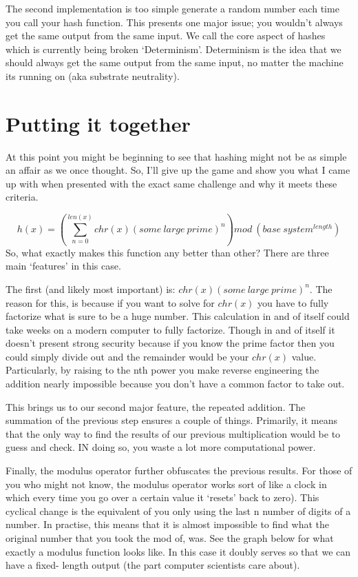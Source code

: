 \documentclass[11pt, oneside]{article}   	%
\begin{document}
The second implementation is too simple generate a random number each time you call your hash function. This presents one major issue; you wouldn’t always get the same output from the same input. We call the core aspect of hashes which is currently being broken ‘Determinism’. Determinism is the idea that we should always get the same output from the same input, no matter the machine its running on (aka substrate neutrality).

\section{Putting it together}

At this point you might be beginning to see that hashing might not be as simple an affair as we once thought. So, I’ll give up the game and show you what I came up with when presented with the exact same challenge and why it meets these criteria.

\begin{equation}
    h(x) =  \left(\sum_{n=0}^{len(x)} chr(x)(some\ large\ prime)^n\right)  mod\ (base\ system^{length})
\end{equation}
So, what exactly makes this function any better than other? There are three main ‘features’ in this case.

The first (and likely most important) is: $chr(x)(some\ large\ prime)^n$. The reason for this, is because if you want to solve for $chr(x)$ you have to fully factorize what is sure to be a huge number. This calculation in and of itself could take weeks on a modern computer to fully factorize. Though in and of itself it doesn’t present strong security because if you know the prime factor then you could simply divide out and the remainder would be your $chr(x)$ value. Particularly, by raising to the nth power you make reverse engineering the addition nearly impossible because you don’t have a common factor to take out.

This brings us to our second major feature, the repeated addition. The summation of the previous step ensures a couple of things. Primarily, it means that the only way to find the results of our previous multiplication would be to guess and check. IN doing so, you waste a lot more computational power.

Finally, the modulus operator further obfuscates the previous results. For those of you who might not know, the modulus operator works sort of like a clock in which every time you go over a certain value it ‘resets’ back to zero). This cyclical change is the equivalent of you only using the last n number of digits of a number. In practise, this means that it is almost impossible to find what the original number that you took the mod of, was. See the graph below for what exactly a modulus function looks like. In this case it doubly serves so that we can have a fixed- length output (the part computer scientists care about).
\end{document}
